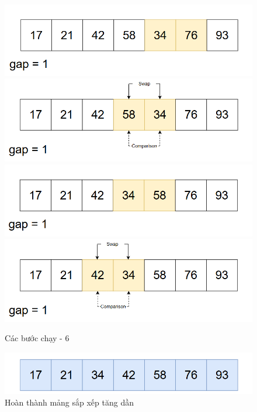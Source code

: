 \begin{figure}[H]
    \centering
    \includegraphics[width=1\linewidth]{img/shell_sort/21.png}
    \vspace{0.15cm}
    \includegraphics[width=1\linewidth]{img/shell_sort/22.png}
    \vspace{0.15cm}
    \includegraphics[width=1\linewidth]{img/shell_sort/23.png}
    \vspace{0.15cm}
    \includegraphics[width=1\linewidth]{img/shell_sort/24.png}
    \caption{Các bước chạy - 6}
    \label{fig:part6}
\end{figure}

\begin{figure}[H]
    \centering
    \includegraphics[width=1\linewidth]{img/shell_sort/25.png}
    \caption{Hoàn thành mảng sắp xếp tăng dần}
    \label{fig:part7}
\end{figure}

